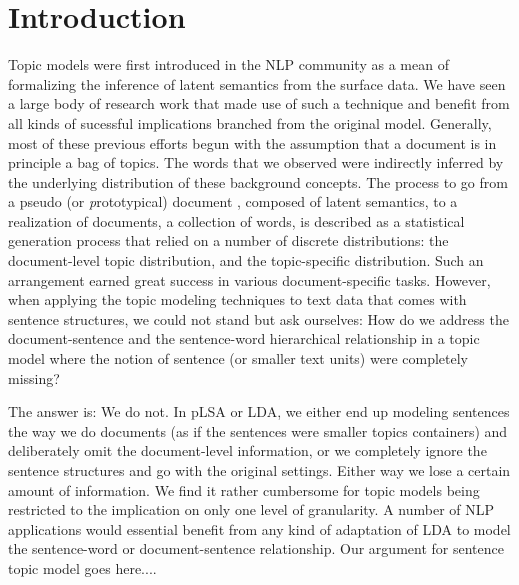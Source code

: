 \begin{abstract}
{ \color{red} (Page 1, top) Here we summarize the contribution of this work.
Supposedly, this work is regarded as an application of topic models over the
sentence level. }

\end{abstract}

\section{Introduction}

Topic models were first introduced in the NLP community as a mean of
formalizing the inference of latent semantics from the surface data.  We have
seen a large body of research work that made use of such a technique and
benefit from all kinds of sucessful implications branched from the original
model.  Generally, most of these previous efforts begun with the assumption
that a document is in principle a bag of topics.  The words that we observed
were indirectly inferred by the underlying distribution of these background
concepts.  The process to go from a pseudo (or {\emph prototypical}) document ,
composed of latent semantics, to a realization of documents, a collection of
words, is described as a statistical generation process that relied on a number
of discrete distributions: the document-level topic distribution, and the
topic-specific distribution.  Such an arrangement earned great success in
various document-specific tasks.  However, when applying the topic modeling
techniques to text data that comes with sentence structures, we could not stand
but ask ourselves: How do we address the document-sentence and the
sentence-word hierarchical relationship in a topic model where the notion of
sentence (or smaller text units) were completely missing?  

The answer is: We do not.  In pLSA or LDA, we either end up modeling sentences
the way we do documents (as if the sentences were smaller topics containers)
and deliberately omit the document-level information, or we completely ignore
the sentence structures and go with the original settings.  Either way we lose
a certain amount of information.  We find it rather cumbersome for topic models
being restricted to the implication on only one level of granularity.  A number
of NLP applications would essential benefit from any kind of adaptation of LDA
to model the sentence-word or document-sentence relationship. {\color{red} Our argument for sentence topic model goes here...}.

